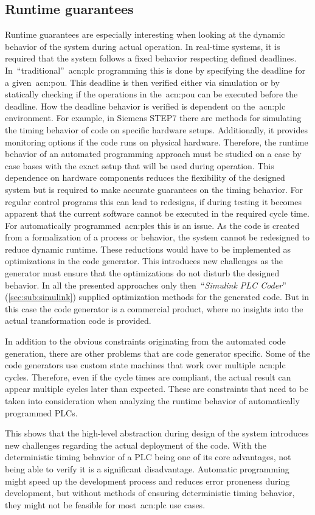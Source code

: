 \subsection{Runtime guarantees}
\label{sec:sub:rt}
Runtime guarantees are especially interesting when looking at the dynamic behavior of the system during actual operation.
In real-time systems, it is required that the system follows a fixed behavior respecting defined deadlines.
In~\enquote{traditional}~\acrshort{acn:plc} programming this is done by specifying the deadline for a given~\acrfull{acn:pou}.
This deadline is then verified either via simulation or by statically checking if the operations in the~\acrshort{acn:pou} can be executed before the deadline.
How the deadline behavior is verified is dependent on the~\acrshort{acn:plc} environment.
For example, in Siemens STEP7 there are methods for simulating the timing behavior of code on specific hardware setups.
Additionally, it provides monitoring options if the code runs on physical hardware.
Therefore, the runtime behavior of an automated programming approach must be studied on a case by case bases with the exact setup that will be used during operation.
This dependence on hardware components reduces the flexibility of the designed system but is required to make accurate guarantees on the timing behavior.
For regular control programs this can lead to redesigns, if during testing it becomes apparent that the current software cannot be executed in the required cycle time.
For automatically programmed~\acrshort{acn:plc}s this is an issue.
As the code is created from a formalization of a process or behavior, the system cannot be redesigned to reduce dynamic  runtime.
These reductions would have to be implemented as optimizations in the code generator.
This introduces new challenges as the generator must ensure that the optimizations do not disturb the designed behavior.
In all the presented approaches only then~\enquote{\textit{Simulink PLC Coder}} (\ref{sec:sub:simulink}) supplied optimization methods for the generated code.
But in this case the code generator is a commercial product, where no insights into the actual transformation code is provided.

In addition to the obvious constraints originating from the automated code generation, there are other problems that are code generator specific.
Some of the code generators use custom state machines that work over multiple~\acrshort{acn:plc} cycles.
Therefore, even if the cycle times are compliant, the actual result can appear multiple cycles later than expected.
These are constraints that need to be taken into consideration when analyzing the runtime behavior of automatically programmed PLCs.

This shows that the high-level abstraction during design of the system introduces new challenges regarding the actual deployment of the code.
With the deterministic timing behavior of a PLC being one of its core advantages, not being able to verify it is a significant disadvantage.
Automatic programming might speed up the development process and reduces error proneness during development, but without methods of ensuring deterministic timing behavior, they might not be feasible for most~\acrshort{acn:plc} use cases.
